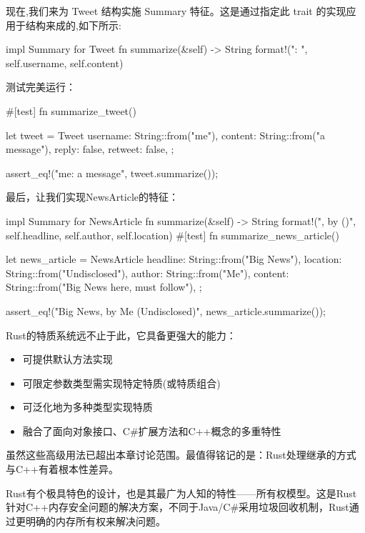 现在,我们来为 Tweet 结构实施 Summary 特征。这是通过指定此 trait 的实现应用于结构来成的,如下所示:

\begin{rust}
impl Summary for Tweet {
  fn summarize(&self) -> String {
    format!("{}: {}", self.username, self.content)
  }
}
\end{rust}

测试完美运行：

\begin{rust}
#[test]
fn summarize_tweet() {
  let tweet = Tweet {
    username: String::from("me"),
    content: String::from("a message"),
    reply: false,
    retweet: false,
  };

  assert_eq!("me: a message", tweet.summarize());
}
\end{rust}

最后，让我们实现NewsArticle的特征：

\begin{rust}
impl Summary for NewsArticle {
  fn summarize(&self) -> String {
    format!("{}, by {} ({})", self.headline, self.author, self.location)
  }
}
#[test]
  fn summarize_news_article() {
    let news_article = NewsArticle {
      headline: String::from("Big News"),
      location: String::from("Undisclosed"),
      author: String::from("Me"),
      content: String::from("Big News here, must follow"),
    };

    assert_eq!("Big News, by Me (Undisclosed)", news_article.summarize());
  }
\end{rust}

Rust的特质系统远不止于此，它具备更强大的能力：

\begin{itemize}
\item 
可提供默认方法实现

\item 
可限定参数类型需实现特定特质(或特质组合)

\item 
可泛化地为多种类型实现特质

\item 
融合了面向对象接口、C\#扩展方法和C++概念的多重特性
\end{itemize}

虽然这些高级用法已超出本章讨论范围。最值得铭记的是：Rust处理继承的方式与C++有着根本性差异。


Rust有个极具特色的设计，也是其最广为人知的特性——所有权模型。这是Rust针对C++内存安全问题的解决方案，不同于Java/C\#采用垃圾回收机制，Rust通过更明确的内存所有权来解决问题。

